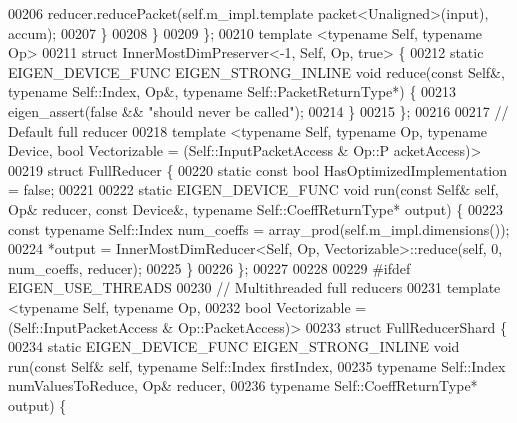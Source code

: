 \begin{DoxyCode}
00206       reducer.reducePacket(\textcolor{keyword}{self}.m\_impl.template packet<Unaligned>(input), accum);
00207     \}
00208   \}
00209 \};
00210 \textcolor{keyword}{template} <\textcolor{keyword}{typename} Self, \textcolor{keyword}{typename} Op>
00211 \textcolor{keyword}{struct }InnerMostDimPreserver<-1, Self, Op, true> \{
00212   \textcolor{keyword}{static} EIGEN\_DEVICE\_FUNC EIGEN\_STRONG\_INLINE \textcolor{keywordtype}{void} reduce(\textcolor{keyword}{const} Self&, \textcolor{keyword}{typename} Self::Index, Op&, \textcolor{keyword}{typename}
       Self::PacketReturnType*) \{
00213     eigen\_assert(\textcolor{keyword}{false} && \textcolor{stringliteral}{"should never be called"});
00214   \}
00215 \};
00216 
00217 \textcolor{comment}{// Default full reducer}
00218 \textcolor{keyword}{template} <\textcolor{keyword}{typename} Self, \textcolor{keyword}{typename} Op, \textcolor{keyword}{typename} Device, \textcolor{keywordtype}{bool} Vectorizable = (Self::InputPacketAccess & Op::P
      acketAccess)>
00219 \textcolor{keyword}{struct }FullReducer \{
00220   \textcolor{keyword}{static} \textcolor{keyword}{const} \textcolor{keywordtype}{bool} HasOptimizedImplementation = \textcolor{keyword}{false};
00221 
00222   \textcolor{keyword}{static} EIGEN\_DEVICE\_FUNC \textcolor{keywordtype}{void} run(\textcolor{keyword}{const} Self& \textcolor{keyword}{self}, Op& reducer, \textcolor{keyword}{const} Device&, \textcolor{keyword}{typename} 
      Self::CoeffReturnType* output) \{
00223     \textcolor{keyword}{const} \textcolor{keyword}{typename} Self::Index num\_coeffs = array\_prod(\textcolor{keyword}{self}.m\_impl.dimensions());
00224     *output = InnerMostDimReducer<Self, Op, Vectorizable>::reduce(\textcolor{keyword}{self}, 0, num\_coeffs, reducer);
00225   \}
00226 \};
00227 
00228 
00229 \textcolor{preprocessor}{#ifdef EIGEN\_USE\_THREADS}
00230 \textcolor{comment}{// Multithreaded full reducers}
00231 \textcolor{keyword}{template} <\textcolor{keyword}{typename} Self, \textcolor{keyword}{typename} Op,
00232           \textcolor{keywordtype}{bool} Vectorizable = (Self::InputPacketAccess & Op::PacketAccess)>
00233 \textcolor{keyword}{struct} FullReducerShard \{
00234   \textcolor{keyword}{static} EIGEN\_DEVICE\_FUNC EIGEN\_STRONG\_INLINE \textcolor{keywordtype}{void} run(\textcolor{keyword}{const} Self& \textcolor{keyword}{self}, \textcolor{keyword}{typename} Self::Index firstIndex,
00235                   \textcolor{keyword}{typename} Self::Index numValuesToReduce, Op& reducer,
00236                   \textcolor{keyword}{typename} Self::CoeffReturnType* output) \{

\end{DoxyCode}
